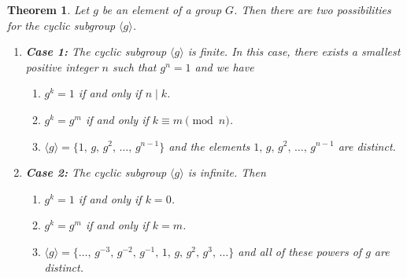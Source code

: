 \documentclass[11pt]{article}
\newcommand{\divides}{\ensuremath{\mid}}
\newcommand{\<}{\ensuremath{\langle}}
\renewcommand{\>}{\ensuremath{\rangle}}
\theoremstyle{plain}
\newtheorem{thm}{Theorem}%
\theoremstyle{definition}
\begin{document}
\begin{thm} 
\label{thm:4}
   Let $g$ be an element of a group $G$.  Then there are
two possibilities for the cyclic subgroup $\langle g\rangle$.
\begin{enumerate}
\item[{ }]{\bf Case 1:}  The cyclic subgroup $\langle g\rangle$ is finite.  In this
case, there exists a smallest positive integer $n$ such that
$g^n=1$ and we have
\begin{enumerate}
\item $g^k=1$ if and only if $n\divides k$.
\item  $g^k=g^m$ if and only if $k\equiv m \pmod{n}$.
\item  $\langle g\rangle =\{1,\, g,\, g^2,\, \ldots,\, g^{n-1}\}$ and
the elements $1,\, g,\, g^2,\, \ldots,\, g^{n-1}$ are distinct.
\end{enumerate}

\item[{ }]{\bf Case 2:}  The cyclic subgroup $\langle g\rangle $ is infinite.
Then
\begin{enumerate}\addtocounter{enumii}{3}
\item $g^k=1$ if and only if $k=0$.
\item  $g^k=g^m$ if and only if $k=m$.
\item  $\langle g\rangle =\{ \ldots,\, g^{-3},\,
g^{-2},\, g^{-1},\, 1,\, g,\,g^2,\, g^3,\, \ldots\}$ and all of
these powers of $g$ are distinct.
\end{enumerate}
\end{enumerate}
\end{thm}
\end{document}
